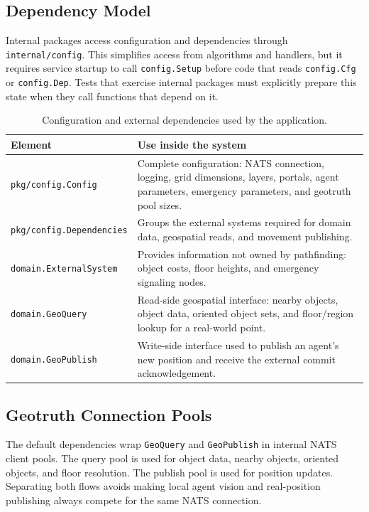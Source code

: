 \documentclass[12pt,a4paper]{report}
\begin{document}
\subsection{Dependency Model}

Internal packages access configuration and dependencies through
\texttt{internal/config}. This simplifies access from algorithms and handlers,
but it requires service startup to call \texttt{config.Setup} before code that
reads \texttt{config.Cfg} or \texttt{config.Dep}. Tests that exercise internal
packages must explicitly prepare this state when they call functions that depend
on it.

\begin{table}[H]
\centering
\begin{tabular}{|p{}|p{}|}
\hline
\textbf{Element} & \textbf{Use inside the system} \\
\hline
\texttt{pkg/config.Config} &
Complete configuration: NATS connection, logging, grid dimensions, layers,
portals, agent parameters, emergency parameters, and geotruth pool sizes. \\
\hline
\texttt{pkg/config.Dependencies} &
Groups the external systems required for domain data, geospatial reads, and
movement publishing. \\
\hline
\texttt{domain.ExternalSystem} &
Provides information not owned by pathfinding: object costs, floor heights, and
emergency signaling nodes. \\
\hline
\texttt{domain.GeoQuery} &
Read-side geospatial interface: nearby objects, object data, oriented object
sets, and floor/region lookup for a real-world point. \\
\hline
\texttt{domain.GeoPublish} &
Write-side interface used to publish an agent's new position and receive the
external commit acknowledgement. \\
\hline
\end{tabular}
\caption{Configuration and external dependencies used by the application.}
\end{table}

\subsection{Geotruth Connection Pools}

The default dependencies wrap \texttt{GeoQuery} and \texttt{GeoPublish} in
internal NATS client pools. The query pool is used for object data, nearby
objects, oriented objects, and floor resolution. The publish pool is used for
position updates. Separating both flows avoids making local agent vision and
real-position publishing always compete for the same NATS connection.
\end{document}
